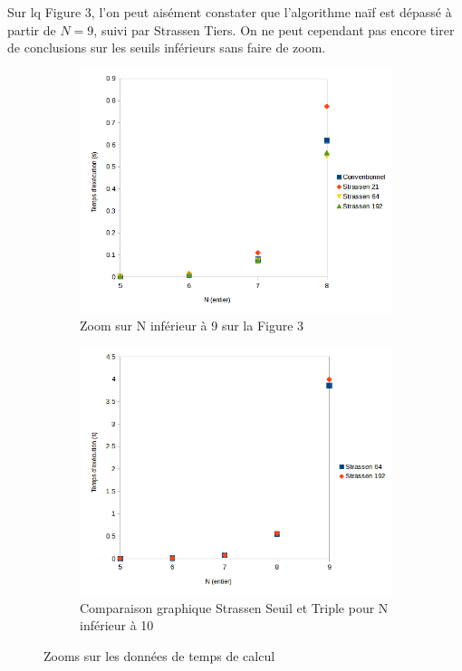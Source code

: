 \documentclass[10pt,a4paper]{article}
\begin{document}
Sur lq Figure 3, l'on peut aisément constater que l'algorithme naïf est dépassé à partir de $ N = 9 $, suivi par Strassen Tiers. On ne peut cependant pas encore tirer de conclusions sur les seuils inférieurs sans faire de zoom.

\begin{figure}[h!]
	\begin{subfigure}[c]{0.5\textwidth}
		\centering
		\includegraphics[width=\textwidth]{spreadsheet/graph2}
		\caption{Zoom sur N inférieur à 9 sur la Figure 3}
	\end{subfigure}
	\begin{subfigure}[c]{0.5\textwidth}
		\centering
		\includegraphics[width=\textwidth]{spreadsheet/graph3}
		\caption{Comparaison graphique Strassen Seuil et Triple pour N inférieur à 10}
	\end{subfigure}
	\caption{Zooms sur les données de temps de calcul}
\end{figure}
\end{document}
